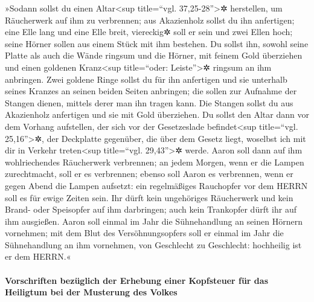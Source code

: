  »Sodann sollst du einen Altar\textless sup title=``vgl.
37,25-28''\textgreater✲ herstellen, um Räucherwerk auf ihm zu
verbrennen; aus Akazienholz sollst du ihn anfertigen; 
eine Elle lang und eine Elle breit, viereckig✲ soll er sein und zwei
Ellen hoch; seine Hörner sollen aus einem Stück mit ihm bestehen.
 Du sollst ihn, sowohl seine Platte als auch die Wände
ringsum und die Hörner, mit feinem Gold überziehen und einen goldenen
Kranz\textless sup title=``oder: Leiste''\textgreater✲ ringsum an ihm
anbringen.  Zwei goldene Ringe sollst du für ihn
anfertigen und sie unterhalb seines Kranzes an seinen beiden Seiten
anbringen; die sollen zur Aufnahme der Stangen dienen, mittels derer man
ihn tragen kann.  Die Stangen sollst du aus Akazienholz
anfertigen und sie mit Gold überziehen.  Du sollst den
Altar dann vor dem Vorhang aufstellen, der sich vor der Gesetzeslade
befindet\textless sup title=``vgl. 25,16''\textgreater✲, der Deckplatte
gegenüber, die über dem Gesetz liegt, woselbst ich mit dir in Verkehr
treten\textless sup title=``vgl. 29,43''\textgreater✲ werde.
 Aaron soll dann auf ihm wohlriechendes Räucherwerk
verbrennen; an jedem Morgen, wenn er die Lampen zurechtmacht, soll er es
verbrennen;  ebenso soll Aaron es verbrennen, wenn er
gegen Abend die Lampen aufsetzt: ein regelmäßiges Rauchopfer vor dem
HERRN soll es für ewige Zeiten sein.  Ihr dürft kein
ungehöriges Räucherwerk und kein Brand- oder Speisopfer auf ihm
darbringen; auch kein Trankopfer dürft ihr auf ihm ausgießen.
 Aaron soll einmal im Jahr die Sühnehandlung an seinen
Hörnern vornehmen; mit dem Blut des Versöhnungsopfers soll er einmal im
Jahr die Sühnehandlung an ihm vornehmen, von Geschlecht zu Geschlecht:
hochheilig ist er dem HERRN.«

\hypertarget{vorschriften-bezuxfcglich-der-erhebung-einer-kopfsteuer-fuxfcr-das-heiligtum-bei-der-musterung-des-volkes}{%
\paragraph{Vorschriften bezüglich der Erhebung einer Kopfsteuer für das
Heiligtum bei der Musterung des
Volkes}\label{vorschriften-bezuxfcglich-der-erhebung-einer-kopfsteuer-fuxfcr-das-heiligtum-bei-der-musterung-des-volkes}}

